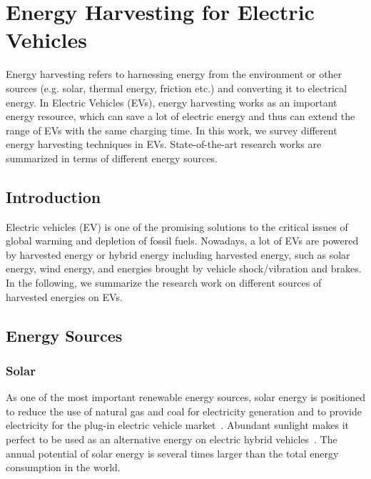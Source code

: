 \section{Energy Harvesting for Electric Vehicles} \label{sec:harvesting}

Energy harvesting refers to harnessing energy from the environment or other sources (e.g. solar, thermal energy, friction etc.) and converting it to electrical energy. 
In Electric Vehicles (EVs), energy harvesting works as an important energy resource, which can save a lot of electric energy and thus can extend the range of EVs with the same charging time. 
In this work, we survey different energy harvesting techniques in EVs. 
State-of-the-art research works are summarized in terms of different energy sources.

\subsection{Introduction}

Electric vehicles (EV) is one of the promising solutions to the critical issues of global warming and depletion of fossil fuels.
Nowadays, a lot of EVs are powered by harvested energy or hybrid energy including harvested energy, such as solar energy, wind energy, and energies brought by vehicle shock/vibration and brakes.
In the following, we summarize the research work on different sources of harvested energies on EVs.

\subsection{Energy Sources}

\subsubsection{Solar}

As one of the most important renewable energy sources, solar energy is positioned to reduce the use of natural gas and coal for electricity generation and to provide electricity for the plug-in electric vehicle market~\cite{JX_21}. Abundant sunlight makes it perfect to be used as an alternative energy on electric hybrid vehicles~\cite{JX_10,JX_63}. The annual potential of solar energy is several times larger than the total energy consumption in the world.

